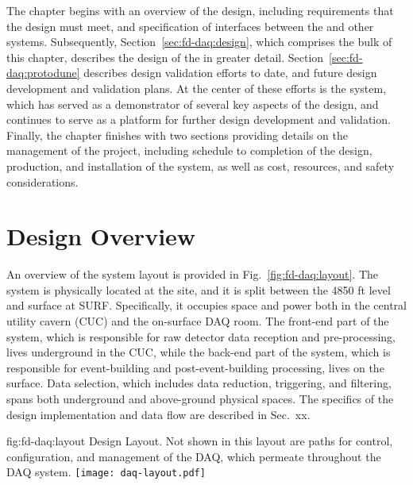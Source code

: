The chapter begins with an overview of the  design,
including requirements that the design must meet, and specification of
interfaces between the   and other   systems. 
Subsequently, Section~\ref{sec:fd-daq:design}, which comprises the
bulk of this chapter, describes the design of the 
 in greater detail.
Section~\ref{sec:fd-daq:protodune} describes design validation efforts
to date, and future design development and validation plans. At the
center of these efforts is the 
  system, which has served as a demonstrator of several
key aspects of the      design, and continues to serve as a
platform for further design development and validation. 
Finally, the chapter finishes with two sections providing details on
the management of the
 project, including schedule to completion of the design, 
production, and installation of the system, as well as cost, resources, and
safety considerations.

\section{Design Overview}
\label{sec:fd-daq:overview}

An overview of the    system layout is
provided in Fig.~\ref{fig:fd-daq:layout}. The system is
physically located at the  site, and it is split between the
4850 ft level and surface at SURF. Specifically, it occupies space and
power both in the central utility cavern (CUC) and the on-surface DAQ
room.  The front-end part of the system, which is responsible for
raw detector data reception and pre-processing, lives
underground in the CUC, while the back-end part of the system, which is responsible for
event-building and post-event-building processing, lives on the surface. Data selection, which includes
data reduction, triggering, and filtering, spans both underground and
above-ground physical spaces. The specifics of the design implementation and data flow
are described in Sec.~xx.

\begin{dunefigure}{fig:fd-daq:layout}{ Design
    Layout. Not shown in this layout are
paths for control, configuration, and management of the DAQ, which
permeate throughout the DAQ system. 
}
  \texttt{[image: daq-layout.pdf]}
\end{dunefigure}

